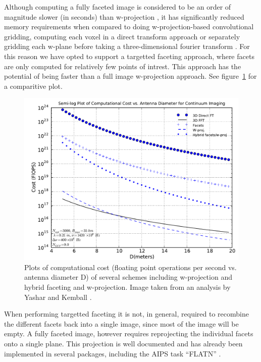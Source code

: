 \documentclass[a4paper, two column]{article}
\begin{document}
Although computing a fully faceted image is considered to be an order of magnitude slower (in seconds) than w-projection \cite{1416440}, it has significantly reduced memory requirements when compared 
to doing w-projection-based convolutional gridding, computing each voxel in a direct transform approach or separately gridding each w-plane before taking a three-dimensional fourier 
transform \cite{yashar2009tdp}. For this reason we have opted to support a targetted faceting approach, where facets are only computed for relatively few points of intrest. This approach
has the potential of being faster than a full image w-projection approach. See figure~\ref{IMG_PERFORMANCE_COMPARISON} for a comparitive plot.
\begin{figure}
 \begin{mdframed}
  \includegraphics[width=1.0\textwidth]{performance_faceting.png}
  \caption{Plots of computational cost (floating point operations per second vs. antenna diameter D) of several schemes including w-projection and hybrid faceting and w-projection. Image taken from an analysis by Yashar and Kemball \cite{yashar2009tdp}.}
  \label{IMG_PERFORMANCE_COMPARISON}
 \end{mdframed}
\end{figure}

When performing targetted faceting it is not, in general, required to recombine the different facets back into a single image, since most of the image will be empty. A fully faceted image, however 
requires reprojecting the individual facets onto a single plane. This projection \cite{sault1996approach} is well documented and has already been implemented in several packages, including 
the AIPS task ``FLATN'' \cite{AIPS113}.
\end{document}
